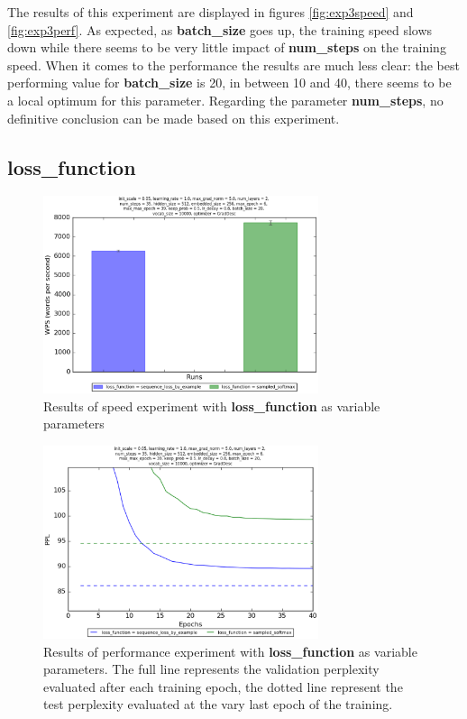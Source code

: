 \documentclass[10pt,a4paper,titlepage]{article}
\begin{document}
The results of this experiment are displayed in figures \ref{fig:exp3speed} and \ref{fig:exp3perf}. As expected,  as \textbf{batch\_size} goes up, the training speed slows down while there seems to be very little impact of \textbf{num\_steps} on the training speed. When it comes to the performance the results are much less clear: the best performing value for \textbf{batch\_size} is 20, in between 10 and 40, there seems to be a local optimum for this parameter. Regarding the parameter \textbf{num\_steps}, no definitive conclusion can be made based on this experiment.

\subsection{loss\_function}

\begin{figure}[H]
	\begin{center}
		\includegraphics[width=0.72\textwidth]{lossspeed.eps}
		\caption{Results of speed experiment with \textbf{loss\_function} as variable parameters}
		\label{fig:exp4speed}
	\end{center}	
\end{figure}

\begin{figure}[H]
	\begin{center}
		\includegraphics[width=0.72\textwidth]{lossperf.eps}
		\caption{Results of performance experiment with \textbf{loss\_function} as variable parameters. The full line represents the validation perplexity evaluated after each training epoch, the dotted line represent the test perplexity evaluated at the vary last epoch of the training.}
		\label{fig:exp4perf}
	\end{center}	
\end{figure}
\end{document}
